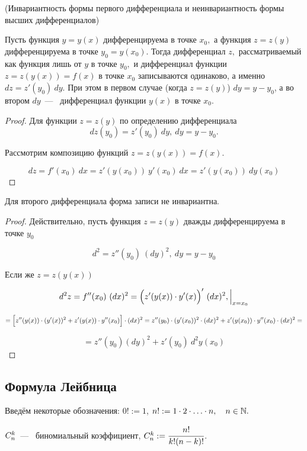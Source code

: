 \begin{theorem}
	\hypertarget{thrm5.7}{(Инвариантность формы первого дифференциала и неинвариантность формы высших дифференциалов)} Пусть функция $y = y(x)$ дифференцируема в точке $x_{0},$ а функция $z = z(y)$ дифференцируема в точке $y_{0} = y(x_{0})$. Тогда дифференциал $z,$ рассматриваемый как функция лишь от $y$ в точке $y_{0},$  и дифференциал функции $z= z(y(x)) = f(x)$ в точке $x_{0}$ записываются одинаково, а именно $dz = z'(y_{0}) \ dy$. При этом в первом случае (когда $z=z(y)$) $dy = y-y_{0}$, а во втором $dy$~---~ дифференциал функции $y(x)$ в точке $x_{0}$.
\end{theorem}
\begin{proof}
	Для функции $z = z(y)$ по определению дифференциала 
	$$dz(y_{0}) = z'(y_{0}) \ dy, \ dy = y-y_{0}.$$
	
	Рассмотрим композицию функций $z = z(y(x)) = f(x)$.
	
	$$dz = f'(x_{0}) \ dx = z'(y(x_{0})) \ y'(x_{0}) \ dx = z'(y(x_{0})) \ dy(x_{0})$$
\end{proof}

\begin{note}
	Для второго дифференциала форма записи не инвариантна.
\end{note}
\begin{proof}
	Действительно, пусть функция $z = z(y)$ дважды дифференцируема в точке $y_{0}$
	
	$$d^{2} = z''(y_{0}) \ (dy)^{2}, \ dy = y-y_{0}$$
	
	Если же $z = z(y(x))$
	
	$$d^{2} z = f''(x_{0}) \ (dx)^{2} = \Bigl( z'(y(x)) \cdot y'(x) \Bigr)' \ (dx)^{2}, \Big|_{x = x_{0}}
	$$
	
	$$
	= \Bigl[z''(y(x)) \cdot (y'(x))^{2} + z'(y(x))\cdot y''(x_{0}) \Bigr] \cdot (dx)^{2} = z''(y_{0}) \cdot (y'(x_{0}))^{2} \cdot (dx)^{2} + z'(y(x_{0})) \cdot y''(x_{0}) \cdot (dx)^{2} =$$
	
	$$
	= z''(y_{0}) (dy)^2 + z'(y_{0}) \ d^{2} y(x_{0})
	$$
\end{proof}

\subsection{Формула Лейбница}
Введём некоторые обозначения: $0! :=1$, $ n! := 1 \cdot 2 \cdot \ldots \cdot n, \quad n \in \mathbb{N}.$

$ \relax C_{n}^{k}$~---~ биномиальный коэффициент, $ \relax C_{n}^{k} := \cfrac{n!}{k!(n-k)!}$.

